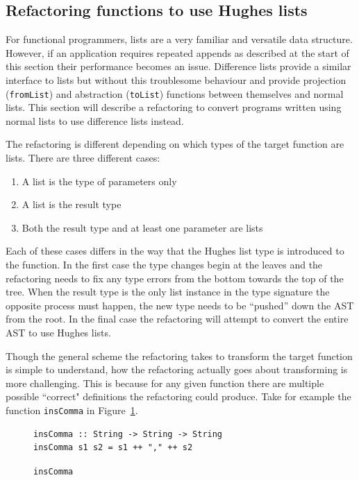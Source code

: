 \subsection{Refactoring functions to use Hughes lists}

For functional programmers, lists are a very familiar and versatile data structure. However, if an application requires repeated appends as described at the start of this section their performance becomes an issue. Difference lists provide a similar interface to lists but without this troublesome behaviour and provide projection (\texttt{fromList}) and abstraction (\texttt{toList}) functions between themselves and normal lists. This section will describe a refactoring to convert programs written using normal lists to use difference lists instead. 


The refactoring is different depending on which types of the target function are lists. There are three different cases:

\begin{enumerate}
		\item A list is the type of parameters only 
		\item A list is the result type
		\item Both the result type and at least one parameter are lists
\end{enumerate} 

Each of these cases differs in the way that the Hughes list type is introduced to the function. In the first case the type changes begin at the leaves and the refactoring needs to fix any type errors from the bottom towards the top of the tree. When the result type is the only list instance in the type signature the opposite process must happen, the new type needs to be ``pushed'' down the AST from the root. In the final case the refactoring will attempt to convert the entire AST to use Hughes lists.

Though the general scheme the refactoring takes to transform the target function is simple to understand, how the refactoring actually goes about transforming is more challenging. This is because for any given function there are multiple possible ``correct" definitions the refactoring could produce. Take for example the function \texttt{insComma} in Figure~\ref{insComma}.

\begin{figure}[t]
\begin{lstlisting}
insComma :: String -> String -> String
insComma s1 s2 = s1 ++ "," ++ s2
\end{lstlisting} 
\caption{\texttt{insComma}}
\label{insComma}
\end{figure} 

